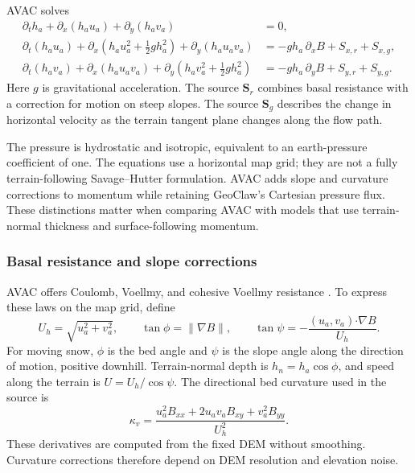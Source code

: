 \documentclass[11pt,a4paper]{article}
\begin{document}
AVAC solves
\begin{align}
  \partial_t h_a
    +\partial_x(h_a u_a)+\partial_y(h_a v_a) &=0,
    \label{eq:avac-mass}\\
  \partial_t(h_a u_a)
    +\partial_x\!\left(h_a u_a^2+\tfrac12 g h_a^2\right)
    +\partial_y(h_a u_a v_a)
    &=-g h_a\,\partial_x B+S_{x,r}+S_{x,g},
    \label{eq:avac-xmomentum}\\
  \partial_t(h_a v_a)
    +\partial_x(h_a u_a v_a)
    +\partial_y\!\left(h_a v_a^2+\tfrac12 g h_a^2\right)
    &=-g h_a\,\partial_y B+S_{y,r}+S_{y,g}.
    \label{eq:avac-ymomentum}
\end{align}
Here $g$ is gravitational acceleration. The source $\boldsymbol{S}_r$
combines basal resistance with a correction for motion on steep slopes.
The source $\boldsymbol{S}_g$ describes the change in horizontal velocity as
the terrain tangent plane changes along the flow path.

The pressure is hydrostatic and isotropic, equivalent to an earth-pressure
coefficient of one. The equations use a horizontal map grid; they are not a
fully terrain-following Savage--Hutter formulation. AVAC adds slope and
curvature corrections to momentum while retaining GeoClaw's Cartesian
pressure flux. These distinctions matter when comparing AVAC with models
that use terrain-normal thickness and surface-following momentum.

\subsubsection{Basal resistance and slope corrections}

AVAC offers Coulomb, Voellmy, and cohesive Voellmy resistance
\citep{Voellmy1955,SalmEtAl1990,ChristenEtAl2010}. To express these laws on the
map grid, define
\begin{equation}
  U_h=\sqrt{u_a^2+v_a^2},\qquad
  \tan\phi=\lVert\nabla B\rVert,\qquad
  \tan\psi=-\frac{(u_a,v_a)\boldsymbol{\cdot}\nabla B}{U_h}.
  \label{eq:avac-geometry}
\end{equation}
For moving snow, $\phi$ is the bed angle and $\psi$ is the slope angle along
the direction of motion, positive downhill. Terrain-normal depth is
$h_n=h_a\cos\phi$, and speed along the terrain is $U=U_h/\cos\psi$.
The directional bed curvature used in the source is
\begin{equation}
  \kappa_v=
  \frac{u_a^2B_{xx}+2u_av_aB_{xy}+v_a^2B_{yy}}{U_h^2}.
  \label{eq:avac-curvature}
\end{equation}
These derivatives are computed from the fixed DEM without smoothing.
Curvature corrections therefore depend on DEM resolution and elevation noise.
\end{document}
